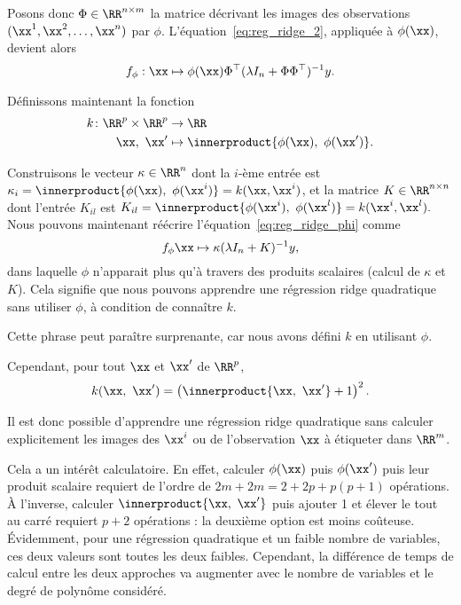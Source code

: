 Posons donc $\Phi \in \RR^{n \times m}$ la matrice
décrivant les images des observations $(\xx^1, \xx^2, \dots, \xx^n)$ par $\phi$.
L'équation~\eqref{eq:reg_ridge_2}, appliquée à $\phi(\xx)$, devient alors
\begin{equation}
  \label{eq:reg_ridge_phi}
  f_\phi: \xx \mapsto \phi(\xx) \Phi^\top (\lambda I_n + \Phi \Phi^\top)^{-1} y.
\end{equation}

Définissons maintenant la fonction
\begin{equation}
  \label{eq:kernel}
  \begin{split}
    k \colon \RR^p \times \RR^p & \to \RR \\
    \xx,~\xx^\prime & \mapsto \innerproduct{\phi(\xx),~\phi(\xx^\prime)}.
  \end{split}
\end{equation}

Construisons le vecteur $\kappa \in \RR^n$ dont la
$i$-ème entrée est
  $\kappa_i = \innerproduct{\phi(\xx),~\phi(\xx^i)} = k(\xx, \xx^i)$,
et la matrice $K \in \RR^{n \times n}$ dont l'entrée $K_{il}$ est
$K_{il} = \innerproduct{\phi(\xx^i),~\phi(\xx^l)} = k(\xx^i, \xx^l).$
Nous pouvons maintenant réécrire l'équation~\eqref{eq:reg_ridge_phi} comme
\begin{equation}
  \label{eq:reg_ridge_k}
  f_\phi \xx \mapsto  \kappa (\lambda I_n + K)^{-1} y,
\end{equation}
dans laquelle $\phi$ n'apparait plus qu'à travers des produits scalaires (calcul de $\kappa$
et $K$).
Cela signifie que nous pouvons apprendre une régression ridge quadratique sans utiliser $\phi$, à condition de connaître $k$.

Cette phrase peut paraître surprenante, car nous avons défini $k$ en utilisant $\phi$.

Cependant, pour tout $\xx$ et $\xx^\prime$ de $\RR^p$,
\begin{equation*}
  k(\xx,~\xx^\prime) = \left(\innerproduct{\xx,~\xx^\prime} + 1 \right)^2.
\end{equation*}

Il est donc possible d'apprendre une régression ridge quadratique sans calculer
explicitement les images des $\xx^i$ ou de l'observation $\xx$ à étiqueter dans
$\RR^m$.

Cela a un intérêt calculatoire. En effet, calculer $\phi(\xx)$ puis
$\phi(\xx^\prime)$ puis leur produit scalaire requiert de l'ordre de
$2m + 2m = 2 + 2p + p(p+1)$ opérations. À l'inverse, calculer
$\innerproduct{\xx,~\xx^\prime}$ puis ajouter 1 et élever le tout au carré
requiert $p+2$ opérations : la deuxième option est moins coûteuse. Évidemment,
pour une régression quadratique et un faible nombre de variables, ces deux
valeurs sont toutes les deux faibles. Cependant, la différence de temps de calcul entre les deux approches va augmenter avec le nombre de variables et le degré de polynôme considéré.

